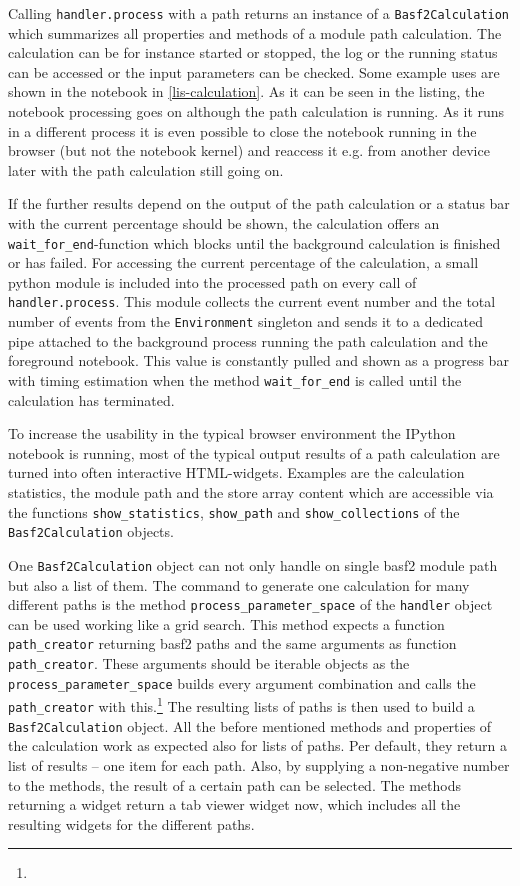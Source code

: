 Calling \texttt{handler.process} with a path returns an instance of a \texttt{Basf2Calculation} which summarizes all properties and methods of a module path calculation. The calculation can be for instance started or stopped, the log or the running status can be accessed or the input parameters can be checked. Some example uses are shown in the notebook in \autoref{lis-calculation}. As it can be seen in the listing, the notebook processing goes on although the path calculation is running. As it runs in a different process it is even possible to close the notebook running in the browser (but not the notebook kernel) and reaccess it e.g. from another device later with the path calculation still going on.

If the further results depend on the output of the path calculation or a status bar with the current percentage should be shown, the calculation offers an \verb+wait_for_end+-function which blocks until the background calculation is finished or has failed. For accessing the current percentage of the calculation, a small python module is included into the processed path on every call of \texttt{handler.process}. This module collects the current event number and the total number of events from the \texttt{Environment} singleton and sends it to a dedicated pipe attached to the background process running the path calculation and the foreground notebook. This value is constantly pulled and shown as a progress bar with timing estimation when the method \verb+wait_for_end+ is called until the calculation has terminated.


To increase the usability in the typical browser environment the IPython notebook is running, most of the typical output results of a path calculation are turned into often interactive HTML-widgets. Examples are the calculation statistics, the module path and the store array content which are accessible via the functions \verb+show_statistics+, \verb+show_path+ and \verb+show_collections+ of the \texttt{Basf2Calculation} objects.

One \texttt{Basf2Calculation} object can not only handle on single basf2 module path but also a list of them. The command to generate one calculation for many different paths is the method \verb+process_parameter_space+ of the \texttt{handler} object can be used working like a grid search. This method expects a function \verb+path_creator+ returning basf2 paths and the same arguments as function \verb+path_creator+. These arguments should be iterable objects as the \verb+process_parameter_space+ builds every argument combination and calls the \verb+path_creator+ with this.\footnote{} The resulting lists of paths is then used to build a \texttt{Basf2Calculation} object. All the before mentioned methods and properties of the calculation work as expected also for lists of paths. Per default, they return a list of results -- one item for each path. Also, by supplying a non-negative number to the methods, the result of a certain path can be selected. The methods returning a widget return a tab viewer widget now, which includes all the resulting widgets for the different paths.

